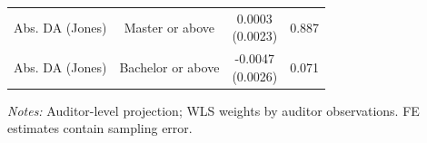 \documentclass[10pt]{article}
\begin{document}
\begin{minipage}{19cm}
\begin{threeparttable}
\begin{tabular}{p{}ccc}
Abs. DA (Jones) & Master or above & \shortstack{0.0003\\(0.0023)} & 0.887 \\
Abs. DA (Jones) & Bachelor or above & \shortstack{-0.0047\\(0.0026)} & 0.071 \\
\bottomrule
\end{tabular}
\begin{tablenotes}\fontsize{9}{11}\selectfont
\item \raggedright \fontsize{9}{11}\selectfont \textit{Notes:} Auditor-level projection; WLS weights by auditor observations. FE estimates contain sampling error.
\end{tablenotes}
\end{threeparttable}

\end{minipage}
\end{document}

